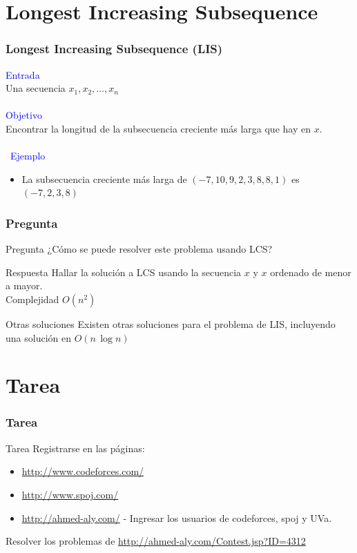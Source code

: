 \documentclass{beamer}
\begin{document}
\section{Longest Increasing Subsequence}
	\begin{frame}
		\frametitle{Longest Increasing Subsequence (LIS)}
		\textcolor{blue}{\large Entrada}\\
		Una secuencia $x_1, x_2, \ldots, x_n$\\ \quad \\
		\textcolor{blue}{\large Objetivo}\\
		Encontrar la longitud de la subsecuencia creciente más larga que hay en $x$.\\ \quad \\\
		\textcolor{blue}{\large Ejemplo}\\
		\begin{itemize}
			\item La subsecuencia creciente más larga de $(-7, 10, 9, 2, 3, 8, 8, 1)$ es $(-7, 2, 3, 8)$
		\end{itemize}
	\end{frame}
	
	\begin{frame}
		\frametitle{Pregunta}
		\begin{alertblock}{Pregunta}
			¿Cómo se puede resolver este problema usando LCS?
		\end{alertblock}
		\pause
		\begin{exampleblock}{Respuesta}
			Hallar la solución a LCS usando la secuencia $x$ y $x$ ordenado de menor a mayor.\\
			Complejidad $O(n^2)$
		\end{exampleblock}
		\pause
		\begin{block}{Otras soluciones}
			Existen otras soluciones para el problema de LIS, incluyendo una solución en $O(n\,\operatorname{log} n)$
		\end{block}
	\end{frame}

\section{Tarea}
	\begin{frame}[fragile]
		\frametitle{Tarea}
		\begin{alertblock}{Tarea}
			Registrarse en las páginas:
			\begin{itemize}
				\item \url{http://www.codeforces.com/}
				\item \url{http://www.spoj.com/}
				\item \url{http://ahmed-aly.com/} - Ingresar los usuarios de codeforces, spoj y UVa.
			\end{itemize}	
			Resolver los problemas de \url{http://ahmed-aly.com/Contest.jsp?ID=4312}
		\end{alertblock}
	\end{frame}
	
\end{document}
